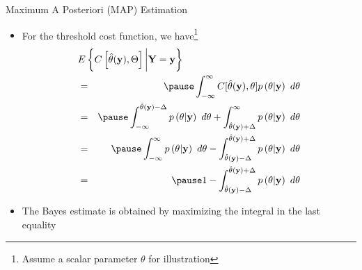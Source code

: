 \documentclass[t]{beamer}
\begin{document}
\begin{frame}{Maximum A Posteriori (MAP) Estimation}
  \footnotesize
  \begin{itemize}
    \item For the threshold cost function, we have\footnote{Assume a scalar parameter $\theta$ for illustration} 
      \begin{eqnarray*}
        \lefteqn{E\left\{ C\left[ \hat{\theta}(\mathbf{y}), \Theta \right] \bigg| \mathbf{Y} = \mathbf{y}\right\}} \\
           & = & \pause \int_{-\infty}^{\infty} C[\hat{\theta}(\mathbf{y}), \theta] p\left(\theta| \mathbf{y}\right) \ d\theta \\
           & = & \pause \int_{-\infty}^{\hat{\theta}(\mathbf{y})-\Delta} p\left(\theta| \mathbf{y}\right) \ d\theta + \int_{\hat{\theta}(\mathbf{y})+\Delta}^{\infty} p\left(\theta| \mathbf{y}\right) \ d\theta\\
           & = & \pause \int_{-\infty}^{\infty} p\left(\theta| \mathbf{y}\right) \ d\theta - \int_{\hat{\theta}(\mathbf{y})-\Delta}^{\hat{\theta}(\mathbf{y})+\Delta} p\left(\theta| \mathbf{y}\right) \ d\theta\\
           & = & \pause 1  - \int_{\hat{\theta}(\mathbf{y})-\Delta}^{\hat{\theta}(\mathbf{y})+\Delta} p\left(\theta| \mathbf{y}\right) \ d\theta
      \end{eqnarray*}
    \item \pause The Bayes estimate is obtained by maximizing the integral in the last equality
  \end{itemize}
  \normalsize
\end{frame}
\end{document}
